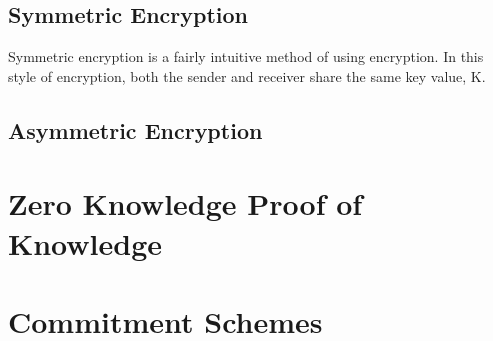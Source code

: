 \subsection{Symmetric Encryption}
Symmetric encryption is a fairly intuitive method of using encryption. In this style of encryption,
both the sender and receiver share the same key value, K.

\subsection{Asymmetric Encryption}

\section{Zero Knowledge Proof of Knowledge}

\section{Commitment Schemes}
